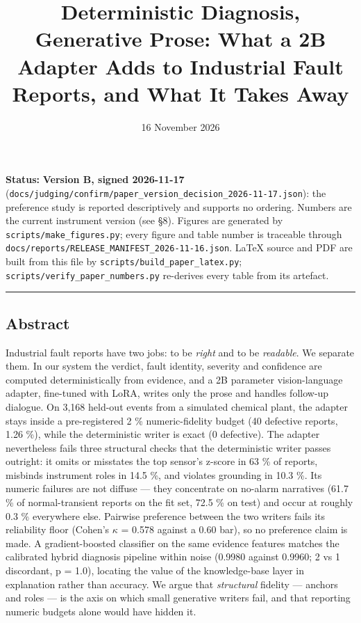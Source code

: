 \documentclass[
  10pt,
]{article}
\title{Deterministic Diagnosis, Generative Prose: What a 2B Adapter Adds
to Industrial Fault Reports, and What It Takes Away}
\author{}
\date{16 November 2026}
\begin{document}
\maketitle

\textbf{Status:} \textbf{Version B, signed 2026-11-17}
(\texttt{docs/\allowbreak{}judging/\allowbreak{}confirm/\allowbreak{}paper\_\allowbreak{}version\_\allowbreak{}decision\_\allowbreak{}2026-11-17.json}):
the preference study is reported descriptively and supports no ordering.
Numbers are the current instrument version (see \S8). Figures are
generated by \texttt{scripts/\allowbreak{}make\_\allowbreak{}figures.py}; every figure and table
number is traceable through
\texttt{docs/\allowbreak{}reports/\allowbreak{}RELEASE\_\allowbreak{}MANIFEST\_\allowbreak{}2026-11-16.json}. LaTeX source
and PDF are built from this file by
\texttt{scripts/\allowbreak{}build\_\allowbreak{}paper\_\allowbreak{}latex.py};
\texttt{scripts/\allowbreak{}verify\_\allowbreak{}paper\_\allowbreak{}numbers.py} re-derives every table from
its artefact.

\begin{center}\rule{0.5\linewidth}{0.5pt}\end{center}

\subsection{Abstract}\label{abstract}

Industrial fault reports have two jobs: to be \emph{right} and to be
\emph{readable}. We separate them. In our system the verdict, fault
identity, severity and confidence are computed deterministically from
evidence, and a 2B parameter vision-language adapter, fine-tuned with
LoRA, writes only the prose and handles follow-up dialogue. On 3,168
held-out events from a simulated chemical plant, the adapter stays
inside a pre-registered 2 \% numeric-fidelity budget (40 defective
reports, 1.26 \%), while the deterministic writer is exact (0
defective). The adapter nevertheless fails three structural checks that
the deterministic writer passes outright: it omits or misstates the top
sensor's z-score in 63 \% of reports, misbinds instrument roles in 14.5
\%, and violates grounding in 10.3 \%. Its numeric failures are not
diffuse --- they concentrate on no-alarm narratives (61.7 \% of
normal-transient reports on the fit set, 72.5 \% on test) and occur at
roughly 0.3 \% everywhere else. Pairwise preference between the two
writers fails its reliability floor (Cohen's $\kappa$ = 0.578 against a 0.60
bar), so no preference claim is made. A gradient-boosted classifier on
the same evidence features matches the calibrated hybrid diagnosis
pipeline within noise (0.9980 against 0.9960; 2 vs 1 discordant, p =
1.0), locating the value of the knowledge-base layer in explanation
rather than accuracy. We argue that \emph{structural} fidelity ---
anchors and roles --- is the axis on which small generative writers
fail, and that reporting numeric budgets alone would have hidden it.
\end{document}
